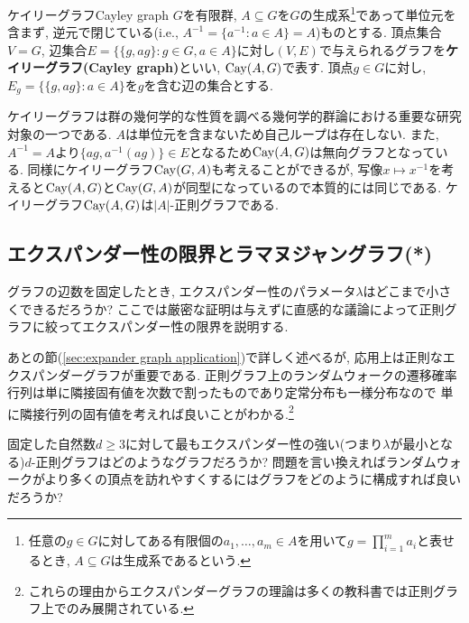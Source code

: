 %
\begin{definition}{ケイリーグラフ}{Cayley graph}
    $G$を有限群, $A\subseteq G$を$G$の生成系\footnote{任意の$g\in G$に対してある有限個の$a_1,\dots,a_m\in A$を用いて$g=\prod_{i=1}^ma_i$と表せるとき, $A\subseteq G$は生成系であるという.}であって単位元を含まず, 逆元で閉じている(i.e., $A^{-1}=\{a^{-1}\colon a\in A\}=A$)ものとする.
    頂点集合$V=G$, 辺集合$E=\{\{g,ag\}\colon g\in G,a\in A\}$に対し$(V,E)$で与えられるグラフを\textbf{ケイリーグラフ(Cayley graph)}といい, $\mathrm{Cay}(A,G)$で表す.
    頂点$g\in G$に対し, $E_g=\{\{g,ag\}\colon a\in A\}$を$g$を含む辺の集合とする.
\end{definition}
%
ケイリーグラフは群の幾何学的な性質を調べる幾何学的群論における重要な研究対象の一つである.
$A$は単位元を含まないため自己ループは存在しない.
また, $A^{-1}=A$より$\{ag,a^{-1}(ag)\}\in E$となるため$\mathrm{Cay}(A,G)$は無向グラフとなっている.
同様にケイリーグラフ$\mathrm{Cay}(G,A)$も考えることができるが, 写像$x\mapsto x^{-1}$を考えると$\mathrm{Cay}(A,G)$と$\mathrm{Cay}(G,A)$が同型になっているので本質的には同じである.
ケイリーグラフ$\mathrm{Cay}(A,G)$は$|A|$-正則グラフである.


\subsection{エクスパンダー性の限界とラマヌジャングラフ(*)}
グラフの辺数を固定したとき, エクスパンダー性のパラメータ$\lambda$はどこまで小さくできるだろうか?
ここでは厳密な証明は与えずに直感的な議論によって正則グラフに絞ってエクスパンダー性の限界を説明する.

あとの節(\cref{sec:expander graph application})で詳しく述べるが,
応用上は正則なエクスパンダーグラフが重要である.
正則グラフ上のランダムウォークの遷移確率行列は単に隣接固有値を次数で割ったものであり定常分布も一様分布なので
単に隣接行列の固有値を考えれば良いことがわかる.\footnote{これらの理由からエクスパンダーグラフの理論は多くの教科書では正則グラフ上でのみ展開されている.}

固定した自然数$d\ge 3$に対して最もエクスパンダー性の強い(つまり$\lambda$が最小となる)$d$-正則グラフはどのようなグラフだろうか?
問題を言い換えればランダムウォークがより多くの頂点を訪れやすくするにはグラフをどのように構成すれば良いだろうか?

